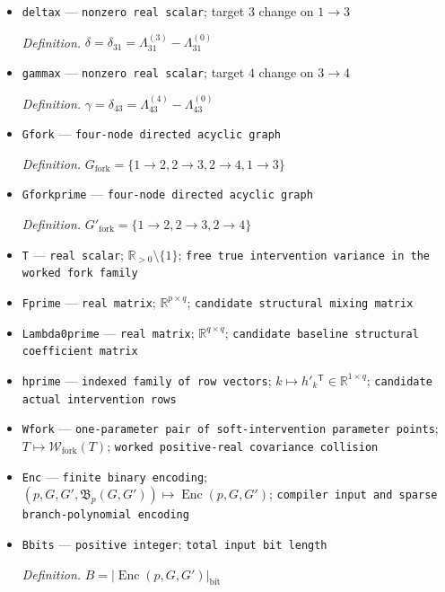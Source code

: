 \documentclass{article}
\begin{document}
\begin{itemize}
  \par\smallskip\noindent\emph{Definition.} \(\beta=\delta_{32}=\Lambda^{(3)}_{32}-\Lambda^{(0)}_{32}\)
  \item \texttt{deltax} --- \texttt{nonzero real scalar}; target \(3\) change on \(1\to3\)
  \par\smallskip\noindent\emph{Definition.} \(\delta=\delta_{31}=\Lambda^{(3)}_{31}-\Lambda^{(0)}_{31}\)
  \item \texttt{gammax} --- \texttt{nonzero real scalar}; target \(4\) change on \(3\to4\)
  \par\smallskip\noindent\emph{Definition.} \(\gamma=\delta_{43}=\Lambda^{(4)}_{43}-\Lambda^{(0)}_{43}\)
  \item \texttt{Gfork} --- \texttt{four-\allowbreak{}node directed acyclic graph}
  \par\smallskip\noindent\emph{Definition.} \(G_{\mathrm{fork}}=\{1\to2,2\to3,2\to4,1\to3\}\)
  \item \texttt{Gforkprime} --- \texttt{four-\allowbreak{}node directed acyclic graph}
  \par\smallskip\noindent\emph{Definition.} \(G'_{\mathrm{fork}}=\{1\to2,2\to3,2\to4\}\)
  \item \texttt{T} --- \texttt{real scalar}; \(\mathbb R_{>0}\setminus\{1\}\); \texttt{free true intervention variance in the worked fork family}
  \item \texttt{Fprime} --- \texttt{real matrix}; \(\mathbb R^{p\times q}\); \texttt{candidate structural mixing matrix}
  \item \texttt{Lambda0prime} --- \texttt{real matrix}; \(\mathbb R^{q\times q}\); \texttt{candidate baseline structural coefficient matrix}
  \item \texttt{hprime} --- \texttt{indexed family of row vectors}; \(k\mapsto h'_k{}^{\mathsf T}\in\mathbb R^{1\times q}\); \texttt{candidate actual intervention rows}
  \item \texttt{Wfork} --- \texttt{one-\allowbreak{}parameter pair of soft-\allowbreak{}intervention parameter points}; \(T\mapsto\mathcal W_{\mathrm{fork}}(T)\); \texttt{worked positive-\allowbreak{}real covariance collision}
  \item \texttt{Enc} --- \texttt{finite binary encoding}; \((p,G,G',\mathfrak B_p(G,G'))\mapsto\operatorname{Enc}(p,G,G')\); \texttt{compiler input and sparse branch-\allowbreak{}polynomial encoding}
  \item \texttt{Bbits} --- \texttt{positive integer}; \texttt{total input bit length}
  \par\smallskip\noindent\emph{Definition.} \(B=|\operatorname{Enc}(p,G,G')|_{\mathrm{bit}}\)

\end{itemize}
\end{document}
